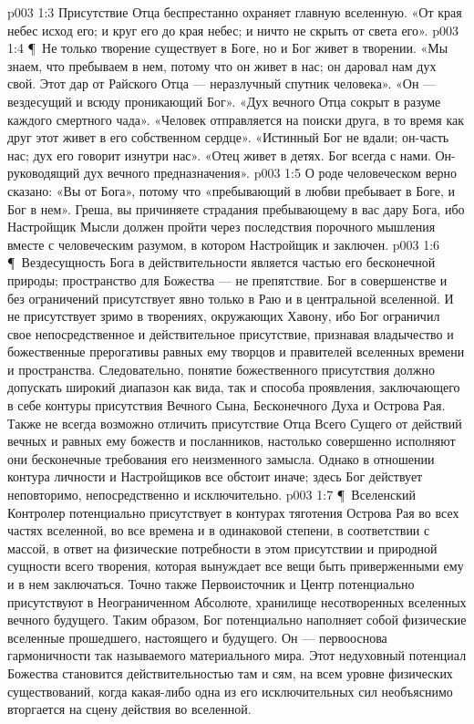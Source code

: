 \vs p003 1:3 Присутствие Отца беспрестанно охраняет главную вселенную. «От края небес исход его; и круг его до края небес; и ничто не скрыть от света его».
\vs p003 1:4 \P\ Не только творение существует в Боге, но и Бог живет в творении. «Мы знаем, что пребываем в нем, потому что он живет в нас; он даровал нам дух свой. Этот дар от Райского Отца --- неразлучный спутник человека». «Он --- вездесущий и всюду проникающий Бог». «Дух вечного Отца сокрыт в разуме каждого смертного чада». «Человек отправляется на поиски друга, в то время как друг этот живет в его собственном сердце». «Истинный Бог не вдали; он\hyp{}часть нас; дух его говорит изнутри нас». «Отец живет в детях. Бог всегда с нами. Он\hyp{}руководящий дух вечного предназначения».
\vs p003 1:5 О роде человеческом верно сказано: «Вы от Бога», потому что «пребывающий в любви пребывает в Боге, и Бог в нем». Греша, вы причиняете страдания пребывающему в вас дару Бога, ибо Настройщик Мысли должен пройти через последствия порочного мышления вместе с человеческим разумом, в котором Настройщик и заключен.
\vs p003 1:6 \P\ Вездесущность Бога в действительности является частью его бесконечной природы; пространство для Божества --- не препятствие. Бог в совершенстве и без ограничений присутствует явно только в Раю и в центральной вселенной. И не присутствует зримо в творениях, окружающих Хавону, ибо Бог ограничил свое непосредственное и действительное присутствие, признавая владычество и божественные прерогативы равных ему творцов и правителей вселенных времени и пространства. Следовательно, понятие божественного присутствия должно допускать широкий диапазон как вида, так и способа проявления, заключающего в себе контуры присутствия Вечного Сына, Бесконечного Духа и Острова Рая. Также не всегда возможно отличить присутствие Отца Всего Сущего от действий вечных и равных ему божеств и посланников, настолько совершенно исполняют они бесконечные требования его неизменного замысла. Однако в отношении контура личности и Настройщиков все обстоит иначе; здесь Бог действует неповторимо, непосредственно и исключительно.
\vs p003 1:7 \P\ Вселенский Контролер потенциально присутствует в контурах тяготения Острова Рая во всех частях вселенной, во все времена и в одинаковой степени, в соответствии с массой, в ответ на физические потребности в этом присутствии и природной сущности всего творения, которая вынуждает все вещи быть приверженными ему и в нем заключаться. Точно также Первоисточник и Центр потенциально присутствуют в Неограниченном Абсолюте, хранилище несотворенных вселенных вечного будущего. Таким образом, Бог потенциально наполняет собой физические вселенные прошедшего, настоящего и будущего. Он --- первооснова гармоничности так называемого материального мира. Этот недуховный потенциал Божества становится действительностью там и сям, на всем уровне физических существований, когда какая\hyp{}либо одна из его исключительных сил необъяснимо вторгается на сцену действия во вселенной.
